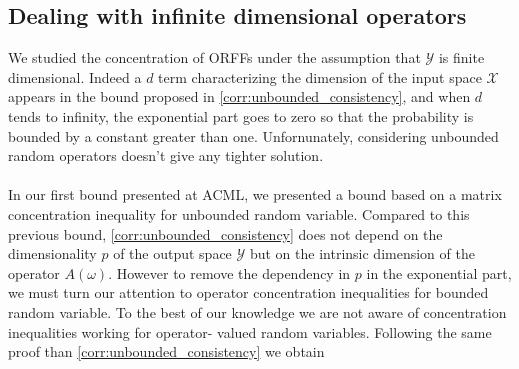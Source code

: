 \subsection{Dealing with infinite dimensional operators}
\label{remark:infinite_dimension}
We studied the concentration of \acsp{ORFF} under the assumption that
$\mathcal{Y}$ is finite dimensional. Indeed a $d$ term characterizing the
dimension of the input space $\mathcal{X}$ appears in the bound proposed in 
\cref{corr:unbounded_consistency}, and when $d$ tends to infinity, the
exponential part goes to zero so that the probability is bounded by a
constant greater than one. Unfornunately, considering unbounded random
operators \citet{minsker2011some} doesn't give any tighter solution.
\paragraph{}
In our first bound presented at \acs{ACML}, we presented a bound based on a
matrix concentration inequality for unbounded random variable. Compared to this
previous bound, \cref{corr:unbounded_consistency} does not depend on the
dimensionality $p$ of the output space $\mathcal{Y}$ but on the intrinsic
dimension of the operator $A(\omega)$. However to remove the dependency in $p$
in the exponential part, we must turn our attention to operator concentration
inequalities for bounded random variable. To the best of our knowledge we are
not aware of concentration inequalities working for  operator-
valued random variables. Following the same proof than
\cref{corr:unbounded_consistency} we obtain
